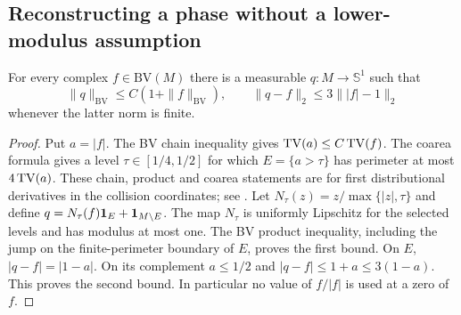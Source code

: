 \subsection{Reconstructing a phase without a lower-modulus assumption}
\begin{lemma}
\label{lem:bv-circle-truncation}
For every complex $f\in\mathrm{BV}(M)$ there is a measurable
$q:M\to\mathbb S^1$ such that
\begin{equation}\label{eq:bv-circle-truncation}
 \|q\|_{\mathrm{BV}}\le C(1+\|f\|_{\mathrm{BV}}),\qquad
 \|q-f\|_2\le3\||f|-1\|_2
\end{equation}
whenever the latter norm is finite.
\end{lemma}
\begin{proof}
Put $a=|f|$. The BV chain inequality gives $\operatorname{TV}(a)\le C\operatorname{TV}(f)$.
The coarea formula gives a level $\tau\in[1/4,1/2]$ for which
$E=\{a>\tau\}$ has perimeter at most $4\operatorname{TV}(a)$.
These chain, product and coarea statements are for first distributional
derivatives in the collision coordinates; see \cite[Chapter 3]{AFP}.
Let $N_\tau(z)=z/\max\{|z|,\tau\}$ and define
$q=N_\tau(f)\mathbf1_E+\mathbf1_{M\setminus E}$.
The map $N_\tau$ is uniformly Lipschitz for the selected levels and
has modulus at most one. The BV product inequality, including the
jump on the finite-perimeter boundary of $E$, proves the first bound.
On $E$, $|q-f|=|1-a|$. On its complement $a\le1/2$ and
$|q-f|\le1+a\le3(1-a)$. This proves the second bound.
In particular no value of $f/|f|$ is used at a zero of $f$.
\end{proof}

